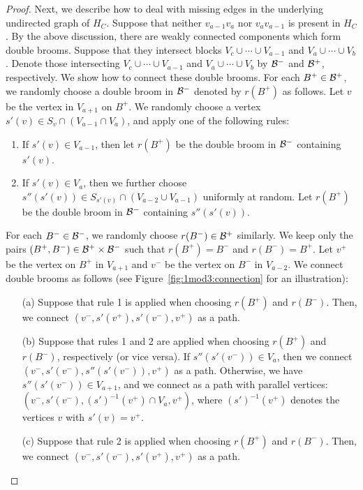\begin{proof}
  Next, we describe how to deal with missing edges in the underlying undirected graph of $H_C$.
  Suppose that neither $v_{a-1} v_a$ nor $v_{a} v_{a-1}$ is present in $H_C$.
  By the above discussion, there are weakly connected components which form double brooms.
  Suppose that they intersect blocks $V_{c} \cup \cdots \cup V_{a-1}$ and  $V_{a} \cup \cdots \cup V_{b}$.
  Denote those intersecting $V_{c} \cup \cdots \cup V_{a-1}$ and  $V_{a} \cup \cdots \cup V_{b}$ by $\mathcal B^{-}$ and $\mathcal B^+$, respectively.
  We show how to connect these double brooms.
  For each $B^+ \in \mathcal B^+$, we randomly choose a double broom in $\mathcal B^-$ denoted by $r(B^+)$ as follows.
  Let $v$ be the vertex in $V_{a+1}$ on $B^+$.
  We randomly choose a vertex $s'(v) \in S_v \cap (V_{a-1} \cap V_{a})$, and 
  apply one of the following rules:
  \begin{enumerate}
    \item
    If $s'(v) \in V_{a-1}$, then let $r(B^+)$ be the double broom in $\mathcal B^-$ containing $s'(v)$.
    \item
    If $s'(v) \in V_{a}$, then we further choose $s''(s'(v)) \in S_{s'(v)} \cap (V_{a-2} \cup V_{a-1})$ uniformly at random.
    Let $r(B^+)$ be the double broom in $\mathcal B^-$ containing $s''(s'(v))$.
  \end{enumerate}
  For each $B^- \in \mathcal B^-$, we randomly choose $r(B^-) \in \mathcal B^+$ similarly.
  We keep only the pairs $(B^+, B^-) \in \mathcal B^+ \times \mathcal B^-$ such that $r(B^+) = B^-$ and $r(B^-)= B^+$.
  Let $v^+$ be the vertex on $B^+$ in $V_{a+1}$ and $v^-$ be the vertex on $B^-$ in $V_{a-2}$.
  We connect double brooms as follows (see Figure~\ref{fig:1mod3:connection} for an illustration):
  \begin{enumerate}
    \item[(a)] Suppose that rule 1 is applied when choosing $r(B^+)$ and $r(B^-)$.
    Then, we connect $(v^-, s'(v^+), s'(v^-),\allowbreak v^+)$ as a path.
    \item[(b)] Suppose that rules 1 and 2 are applied when choosing $r(B^+)$ and $r(B^-)$, respectively (or vice versa).
    If $s''(s'(v^-)) \in V_a$, then we connect $(v^-, s'(v^-), s''(s'(v^-)), v^+)$ as a path.
    Otherwise, we have $s''(s'(v^-)) \in V_{a+1}$, and we connect as a path with parallel vertices: $(v^-, s'(v^-), (s')^{-1}(v^+) \cap V_{a}, v^+)$, where $(s')^{-1}(v^+)$ denotes the vertices $v$ with $s'(v) = v^+$.
    \item[(c)] Suppose that rule 2 is applied when choosing $r(B^+)$ and $r(B^-)$.
    Then, we connect $(v^-, s'(v^-), s'(v^+), \allowbreak v^+)$ as a path.

\end{enumerate}
\end{proof}
